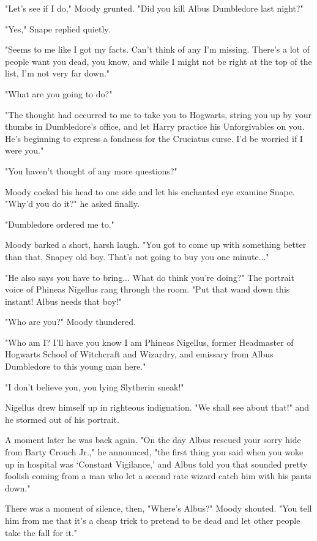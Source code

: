 \documentclass[a4paper,11pt]{article}
\begin{document}
"Let's see if I do," Moody grunted. "Did you kill Albus Dumbledore last night?"

"Yes," Snape replied quietly.

"Seems to me like I got my facts. Can't think of any I'm missing. There's a lot of people want you dead, you know, and while I might not be right at the top of the list, I'm not very far down."

"What are you going to do?"

"The thought had occurred to me to take you to Hogwarts, string you up by your thumbs in Dumbledore's office, and let Harry practice his Unforgivables on you. He's beginning to express a fondness for the Cruciatus curse. I'd be worried if I were you."

"You haven't thought of any more questions?"

Moody cocked his head to one side and let his enchanted eye examine Snape. "Why'd you do it?" he asked finally.

"Dumbledore ordered me to."

Moody barked a short, harsh laugh. "You got to come up with something better than that, Snapey old boy. That's not going to buy you one minute..."

"He also says you have to bring... What do think you're doing?" The portrait voice of Phineas Nigellus rang through the room. "Put that wand down this instant! Albus needs that boy!"

"Who are you?" Moody thundered.

"Who am I? I'll have you know I am Phineas Nigellus, former Headmaster of Hogwarts School of Witchcraft and Wizardry, and emissary from Albus Dumbledore to this young man here."

"I don't believe you, you lying Slytherin sneak!"

Nigellus drew himself up in righteous indignation. "We shall see about that!" and he stormed out of his portrait.

A moment later he was back again. "On the day Albus rescued your sorry hide from Barty Crouch Jr.," he announced, "the first thing you said when you woke up in hospital was `Constant Vigilance,' and Albus told you that sounded pretty foolish coming from a man who let a second rate wizard catch him with his pants down."

There was a moment of silence, then, "Where's Albus?" Moody shouted. "You tell him from me that it's a cheap trick to pretend to be dead and let other people take the fall for it."
\end{document}
